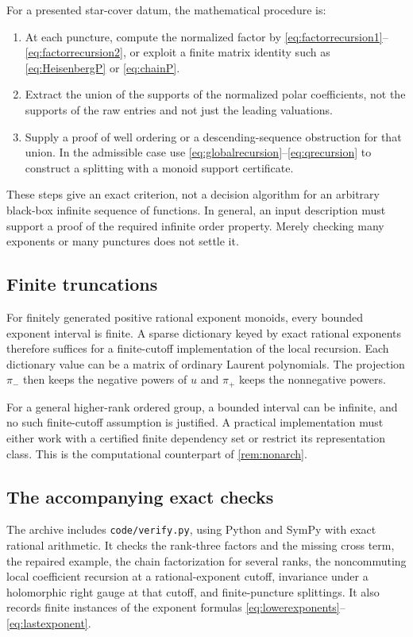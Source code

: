 \documentclass[11pt,letterpaper]{article}
\theoremstyle{definition}
\theoremstyle{remark}
\numberwithin{equation}{section}
\begin{document}
For a presented star-cover datum, the mathematical procedure is:
\begin{enumerate}
\item At each puncture, compute the normalized factor by \eqref{eq:factorrecursion1}--\eqref{eq:factorrecursion2}, or exploit a finite matrix identity such as \eqref{eq:HeisenbergP} or \eqref{eq:chainP}.
\item Extract the union of the supports of the normalized polar coefficients, not the supports of the raw entries and not just the leading valuations.
\item Supply a proof of well ordering or a descending-sequence obstruction for that union. In the admissible case use \eqref{eq:globalrecursion}--\eqref{eq:qrecursion} to construct a splitting with a monoid support certificate.
\end{enumerate}
These steps give an exact criterion, not a decision algorithm for an arbitrary black-box infinite sequence of functions. In general, an input description must support a proof of the required infinite order property. Merely checking many exponents or many punctures does not settle it.

\subsection{Finite truncations}

For finitely generated positive rational exponent monoids, every bounded exponent interval is finite. A sparse dictionary keyed by exact rational exponents therefore suffices for a finite-cutoff implementation of the local recursion. Each dictionary value can be a matrix of ordinary Laurent polynomials. The projection $\pi_-$ then keeps the negative powers of $u$ and $\pi_+$ keeps the nonnegative powers.

For a general higher-rank ordered group, a bounded interval can be infinite, and no such finite-cutoff assumption is justified. A practical implementation must either work with a certified finite dependency set or restrict its representation class. This is the computational counterpart of \cref{rem:nonarch}.

\subsection{The accompanying exact checks}

The archive includes \texttt{code/verify.py}, using Python and SymPy with exact rational arithmetic. It checks the rank-three factors and the missing cross term, the repaired example, the chain factorization for several ranks, the noncommuting local coefficient recursion at a rational-exponent cutoff, invariance under a holomorphic right gauge at that cutoff, and finite-puncture splittings. It also records finite instances of the exponent formulas \eqref{eq:lowerexponents}--\eqref{eq:lastexponent}.
\end{document}
